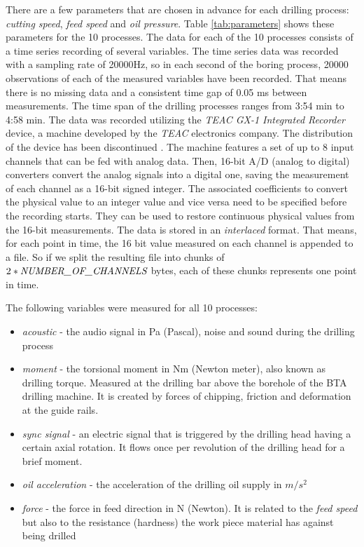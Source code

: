 \documentclass[12 pt]{scrartcl}
\begin{document}
There are a few parameters that are chosen in advance for each drilling process: \emph{cutting speed}, \emph{feed speed} and \emph{oil pressure}. Table \ref{tab:parameters} shows these parameters for the 10 processes.
The data for each of the 10 processes consists of a time series recording of several variables.
The time series data was recorded with a sampling rate of 20000Hz, so in each second of the boring process, 20000 observations of each of the measured variables have been recorded. That means there is no missing data and a consistent time gap of 0.05 ms between measurements. The time span of the drilling processes ranges from 3:54 min to 4:58 min.
The data was recorded utilizing the \emph{TEAC GX-1 Integrated Recorder} device, a machine developed by the \emph{TEAC} electronics company. The distribution of the device has been discontinued \citep{DAQLOGTEAC}. The machine features a set of up to 8 input channels that can be fed with analog data. Then, 16-bit A/D (analog to digital) converters convert the analog signals into a digital one, saving the measurement of each channel as a 16-bit signed integer.
The associated coefficients to convert the physical value to an integer value and vice versa need to be specified before the recording starts. They can be used to restore continuous physical values from the 16-bit measurements. The data is stored in an \emph{interlaced} format. That means, for each point in time, the 16 bit value measured on each channel is appended to a file. So if we split the resulting file into chunks of $2*\emph{NUMBER\_OF\_CHANNELS}$ bytes, each of these chunks represents one point in time.

The following variables were measured for all 10 processes:
\begin{itemize}
  \item \emph{acoustic} - the audio signal in Pa (Pascal), noise and sound during the drilling process
  \item \emph{moment} - the torsional moment in Nm (Newton meter), also known as drilling torque. Measured at the drilling bar above the borehole of the BTA drilling machine. It is created by forces of chipping, friction and deformation at the guide rails.
  \item \emph{sync signal} - an electric signal that is triggered by the drilling head having a certain axial rotation. It flows once per revolution of the drilling head for a brief moment.
  \item \emph{oil acceleration} - the acceleration of the drilling oil supply in $m/s^2$
  \item \emph{force} - the force in feed direction in N (Newton). It is related to the \emph{feed speed} but also to the resistance (hardness) the work piece material has against being drilled
\end{itemize}
\end{document}
